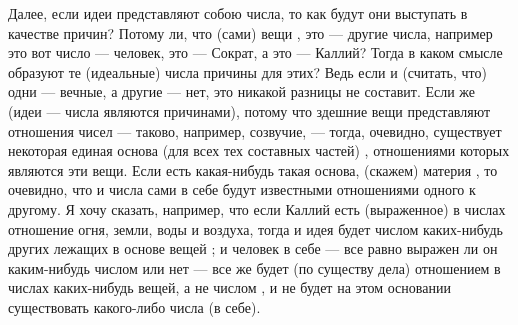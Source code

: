 \documentclass{article}
\begin{document}
Далее, если идеи представляют собою числа, то как будут они выступать в качестве причин? Потому ли, что (сами) вещи
\footnotemark[22]
, это — другие числа, например это вот число — человек, это — Сократ, а это — Каллий? Тогда в каком смысле образуют те (идеальные) числа причины для этих? Ведь если и (считать, что) одни — вечные, а другие — нет, это никакой разницы не составит. Если же (идеи — числа являются причинами), потому что здешние вещи представляют отношения чисел — таково, например, созвучие, — тогда, очевидно, существует некоторая единая основа (для всех тех составных частей)
\footnotemark[23]
, отношениями которых являются эти вещи. Если есть какая-нибудь такая основа, (скажем) материя
\footnotemark[24]
, то очевидно, что и числа сами в себе
\footnotemark[25]
будут известными отношениями одного к другому. Я хочу сказать, например, что если Каллий есть (выраженное) в числах отношение огня, земли, воды и воздуха, тогда и идея будет числом каких-нибудь других лежащих в основе вещей
\footnotemark[26]
; и человек в себе — все равно выражен ли он каким-нибудь числом или нет — все же будет (по существу дела) отношением в числах каких-нибудь вещей, а не числом
\footnotemark[27]
, и не будет на этом основании существовать какого-либо числа (в себе).
\footnotemark[28]
\end{document}
